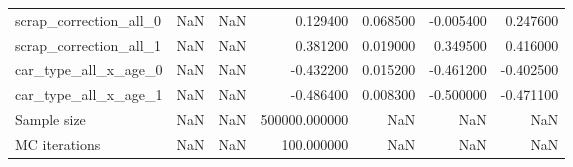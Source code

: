 \begin{tabular}{lrlrrrr}
scrap_correction_all_0 & NaN & NaN & 0.129400 & 0.068500 & -0.005400 & 0.247600 \\
scrap_correction_all_1 & NaN & NaN & 0.381200 & 0.019000 & 0.349500 & 0.416000 \\
car_type_all_x_age_0 & NaN & NaN & -0.432200 & 0.015200 & -0.461200 & -0.402500 \\
car_type_all_x_age_1 & NaN & NaN & -0.486400 & 0.008300 & -0.500000 & -0.471100 \\
Sample size & NaN & NaN & 500000.000000 & NaN & NaN & NaN \\
MC iterations & NaN & NaN & 100.000000 & NaN & NaN & NaN \\
\bottomrule
\end{tabular}
